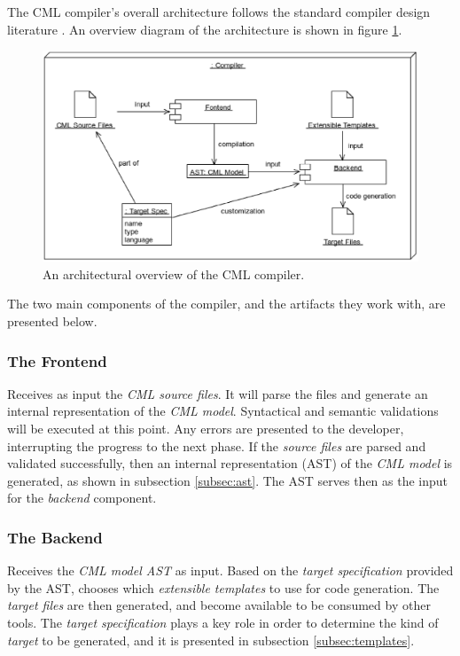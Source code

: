 The CML compiler's overall architecture follows the standard compiler design literature \cite{torben}. An overview diagram of the architecture is shown in figure \ref{fig:overview}.

\begin{figure}
\centering
\includegraphics[width=\textwidth]{compiler/figure-overview}
\caption{An architectural overview of the CML compiler.}
\label{fig:overview}
\end{figure}

The two main components of the compiler,
and the artifacts they work with,
are presented below.

\subsubsection{The Frontend}
Receives as input the \emph{CML source files}.
It will parse the files and generate an internal representation of the \emph{CML model}.
Syntactical and semantic validations will be executed at this point.
Any errors are presented to the developer, interrupting the progress to the next phase.
If the \emph{source files} are parsed and validated successfully, then an internal representation (AST) of the \emph{CML model} is generated, as shown in subsection \ref{subsec:ast}.
The AST serves then as the input for the \emph{backend} component.

\subsubsection{The Backend}
Receives the \emph{CML model AST} as input.
Based on the \emph{target specification} provided by the AST, chooses which \emph{extensible templates} to use for code generation.
The \emph{target files} are then generated, and become available to be consumed by other tools. The \emph{target specification} plays a key role in order to determine the kind of \emph{target} to be generated, and it is presented in subsection \ref{subsec:templates}.